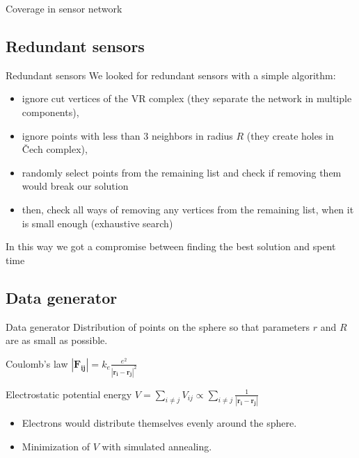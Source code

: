 \documentclass{beamer}
\newcommand{\vect}[1]{\boldsymbol{#1}}
\begin{document}
\begin{frame}{Coverage in sensor network}
\begin{figure}[!ht]
\end{figure}
\end{frame}


\subsection{Redundant sensors}
\begin{frame}{Redundant sensors}{}
We looked for redundant sensors with a simple algorithm:
\begin{itemize}
	\item ignore cut vertices of the VR complex (they separate the network in multiple components),
	\item ignore points with less than 3 neighbors in radius $R$ (they create holes in Čech complex),
	\item randomly select points from the remaining list and check if removing them would break our solution
	\item then, check all ways of removing any vertices from the remaining list, when it is small enough (exhaustive search)
\end{itemize}
In this way we got a compromise between finding the best solution and spent time

\end{frame}





\subsection{Data generator}
\begin{frame}{Data generator}{}
Distribution of points on the sphere so that parameters $r$ and $R$ are as small as possible.
\begin{alertblock}{Coulomb's law}
	\centering $|\vect{F_{ij}}| = k_e \frac{e^2}{|\vect{r_i}-\vect{r_j}|^2}$
\end{alertblock}
\begin{alertblock}{Electrostatic potential energy}
	\centering $V = \sum_{i\neq j}V_{ij} \propto \sum_{i\neq j}\frac{1}{|\vect{r_i} - \vect{r_j}|}$
\end{alertblock}
\begin{itemize}
	\item {Electrons would distribute themselves evenly around the sphere. }
	\item {Minimization of $V$ with simulated annealing.}
\end{itemize}

\end{frame}
\end{document}

